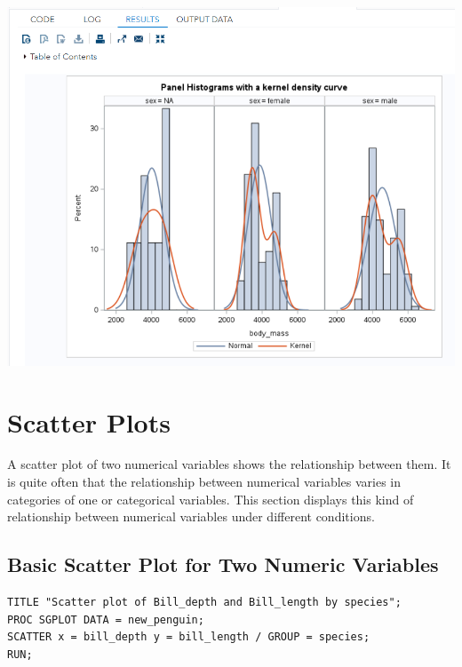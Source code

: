 \documentclass[
]{book}
\begin{document}
\begin{center}\includegraphics[width=1\linewidth]{img06/w06-PanelHistogram} \end{center}

\hypertarget{scatter-plots}{%
\section{Scatter Plots}\label{scatter-plots}}

A scatter plot of two numerical variables shows the relationship between them. It is quite often that the relationship between numerical variables varies in categories of one or categorical variables. This section displays this kind of relationship between numerical variables under different conditions.

\hypertarget{basic-scatter-plot-for-two-numeric-variables}{%
\subsection{Basic Scatter Plot for Two Numeric Variables}\label{basic-scatter-plot-for-two-numeric-variables}}

\begin{verbatim}
TITLE "Scatter plot of Bill_depth and Bill_length by species";
PROC SGPLOT DATA = new_penguin;
SCATTER x = bill_depth y = bill_length / GROUP = species;
RUN;
\end{verbatim}
\end{document}
